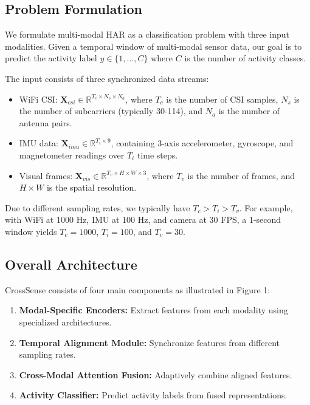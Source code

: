 \documentclass[10pt,twocolumn]{article}
\begin{document}
\subsection{Problem Formulation}

We formulate multi-modal HAR as a classification problem with three input modalities. Given a temporal window of multi-modal sensor data, our goal is to predict the activity label $y \in \{1, ..., C\}$ where $C$ is the number of activity classes.

The input consists of three synchronized data streams:
\begin{itemize}
\item WiFi CSI: $\mathbf{X}_{csi} \in \mathbb{R}^{T_c \times N_s \times N_a}$, where $T_c$ is the number of CSI samples, $N_s$ is the number of subcarriers (typically 30-114), and $N_a$ is the number of antenna pairs.

\item IMU data: $\mathbf{X}_{imu} \in \mathbb{R}^{T_i \times 9}$, containing 3-axis accelerometer, gyroscope, and magnetometer readings over $T_i$ time steps.

\item Visual frames: $\mathbf{X}_{vis} \in \mathbb{R}^{T_v \times H \times W \times 3}$, where $T_v$ is the number of frames, and $H \times W$ is the spatial resolution.
\end{itemize}

Due to different sampling rates, we typically have $T_c > T_i > T_v$. For example, with WiFi at 1000 Hz, IMU at 100 Hz, and camera at 30 FPS, a 1-second window yields $T_c = 1000$, $T_i = 100$, and $T_v = 30$.

\subsection{Overall Architecture}

CrossSense consists of four main components as illustrated in Figure 1:

\begin{enumerate}
\item \textbf{Modal-Specific Encoders:} Extract features from each modality using specialized architectures.
\item \textbf{Temporal Alignment Module:} Synchronize features from different sampling rates.
\item \textbf{Cross-Modal Attention Fusion:} Adaptively combine aligned features.
\item \textbf{Activity Classifier:} Predict activity labels from fused representations.
\end{enumerate}
\end{document}
